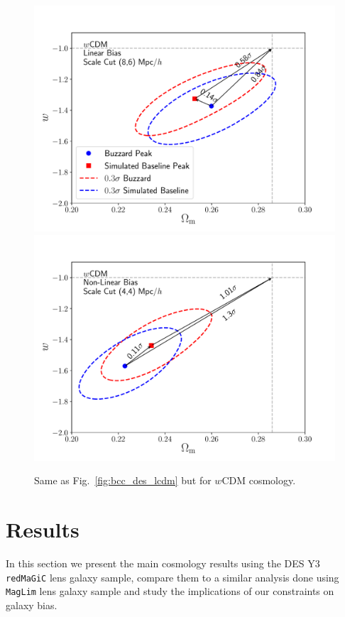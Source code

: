 \documentclass[aps, prd,twocolumn,superscriptaddress,nofootinbib,preprintnumbers]{revtex4-1}
\newcommand{\redmagic}{\texttt{redMaGiC} }
\newcommand{\maglim}{\texttt{MagLim} }
\begin{document}
\begin{figure}
\includegraphics[width=\columnwidth]{figs/Buzzard_linbias86_2x2pt_wcdm.pdf}
\includegraphics[width=\columnwidth]{figs/Buzzard_nlbias44_2x2pt_wcdm.pdf}
\caption[]{Same as Fig.~\ref{fig:bcc_des_lcdm} but for $w$CDM cosmology.
}
\label{fig:bcc_des_wcdm}
\end{figure}


\section{Results}
\label{sec:results}
In this section we present the main cosmology results using the DES Y3 \redmagic lens galaxy sample, compare them to a similar analysis done using \maglim lens galaxy sample and study the implications of our constraints on  galaxy bias. 
\end{document}
